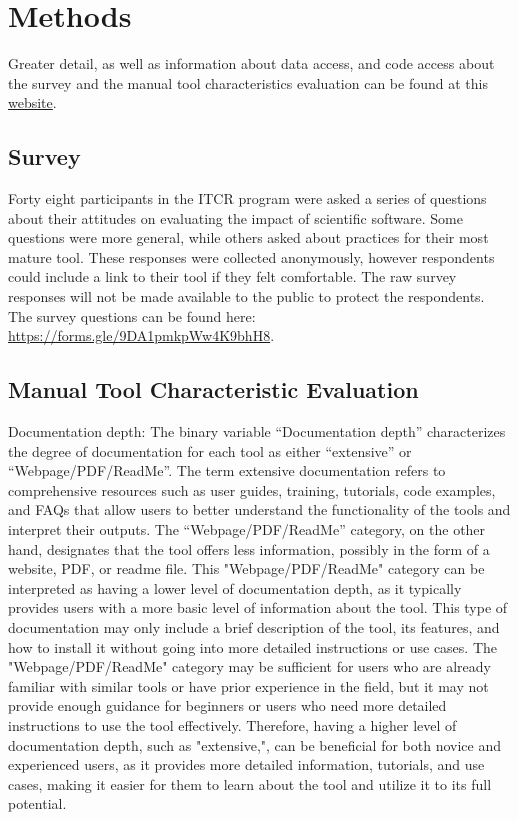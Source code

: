 \documentclass{article}
\begin{document}
\clearpage


\section{Methods}
\label{sec-supp-note-methods}

Greater detail, as well as information about data access, and code access about the survey and the manual tool characteristics evaluation can be found at this \href{https://hutchdatascience.org/ITCR_Metrics_manuscript_website/}{website}.

\subsection{Survey}
\label{sec-supp-note-methods-survey}
Forty eight participants in the ITCR program were asked a series of questions about their attitudes on evaluating the impact of scientific software. Some questions were more general, while others asked about practices for their most mature tool. These responses were collected anonymously, however respondents could include a link to their tool if they felt comfortable. The raw survey responses will not be made available to the public to protect the respondents. The survey questions can be found here: \url{https://forms.gle/9DA1pmkpWw4K9bhH8}.

\subsection{Manual Tool Characteristic Evaluation}

Documentation depth: The binary variable “Documentation depth” characterizes the degree of documentation for each tool as either “extensive” or “Webpage/PDF/ReadMe”. The term extensive documentation refers to comprehensive resources such as user guides, training, tutorials, code examples, and FAQs that allow users to better understand the functionality of the tools and interpret their outputs. The “Webpage/PDF/ReadMe” category, on the other hand, designates that the tool offers less information, possibly in the form of a website, PDF, or readme file. This "Webpage/PDF/ReadMe" category can be interpreted as having a lower level of documentation depth, as it typically provides users with a more basic level of information about the tool. This type of documentation may only include a brief description of the tool, its features, and how to install it without going into more detailed instructions or use cases. The "Webpage/PDF/ReadMe" category may be sufficient for users who are already familiar with similar tools or have prior experience in the field, but it may not provide enough guidance for beginners or users who need more detailed instructions to use the tool effectively. Therefore, having a higher level of documentation depth, such as "extensive,", can be beneficial for both novice and experienced users, as it provides more detailed information, tutorials, and use cases, making it easier for them to learn about the tool and utilize it to its full potential.
\end{document}
